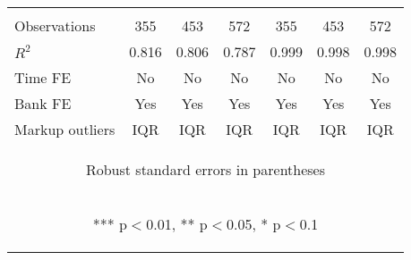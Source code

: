 \documentclass[]{article}
\begin{document}
\begin{center}
\begin{tabular}{lcccccc}
\vspace{4pt} & \begin{footnotesize}\end{footnotesize} & \begin{footnotesize}\end{footnotesize} & \begin{footnotesize}\end{footnotesize} & \begin{footnotesize}\end{footnotesize} & \begin{footnotesize}\end{footnotesize} & \begin{footnotesize}\end{footnotesize} \\
Observations & 355 & 453 & 572 & 355 & 453 & 572 \\
$R^2$ & 0.816 & 0.806 & 0.787 & 0.999 & 0.998 & 0.998 \\
Time FE & No & No & No & No & No & No \\
Bank FE & Yes & Yes & Yes & Yes & Yes & Yes \\
 Markup outliers & IQR & IQR & IQR & IQR & IQR & IQR \\ \hline
\multicolumn{7}{c}{\begin{footnotesize} Robust standard errors in parentheses\end{footnotesize}} \\
\multicolumn{7}{c}{\begin{footnotesize} *** p$<$0.01, ** p$<$0.05, * p$<$0.1\end{footnotesize}} \\
\end{tabular}
\end{center}
\end{document}
